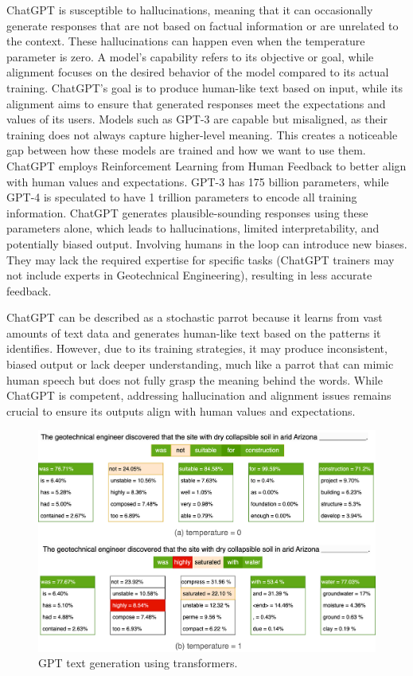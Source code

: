 \documentclass{article}
\begin{document}
ChatGPT is susceptible to hallucinations, meaning that it can occasionally generate responses that are not based on factual information or are unrelated to the context. These hallucinations can happen even when the temperature parameter is zero. A model's capability refers to its objective or goal, while alignment focuses on the desired behavior of the model compared to its actual training. ChatGPT's goal is to produce human-like text based on input, while its alignment aims to ensure that generated responses meet the expectations and values of its users. Models such as GPT-3 are capable but misaligned, as their training does not always capture higher-level meaning. This creates a noticeable gap between how these models are trained and how we want to use them. ChatGPT employs Reinforcement Learning from Human Feedback to better align with human values and expectations. GPT-3 has 175 billion parameters, while GPT-4 \parencite{bubeck2023sparks} is speculated to have 1 trillion parameters to encode all training information. ChatGPT generates plausible-sounding responses using these parameters alone, which leads to hallucinations, limited interpretability, and potentially biased output. Involving humans in the loop can introduce new biases. They may lack the required expertise for specific tasks (ChatGPT trainers may not include experts in Geotechnical Engineering), resulting in less accurate feedback.

ChatGPT can be described as a stochastic parrot because it learns from vast amounts of text data and generates human-like text based on the patterns it identifies. However, due to its training strategies, it may produce inconsistent, biased output or lack deeper understanding, much like a parrot that can mimic human speech but does not fully grasp the meaning behind the words. While ChatGPT is competent, addressing hallucination and alignment issues remains crucial to ensure its outputs align with human values and expectations.

\begin{figure}[ht]
    \centering
    \includegraphics[width = 0.8\linewidth]{figs/transformers.png}
    \caption{GPT text generation using transformers.}
    \label{fig:Transformers}
\end{figure}
\end{document}
